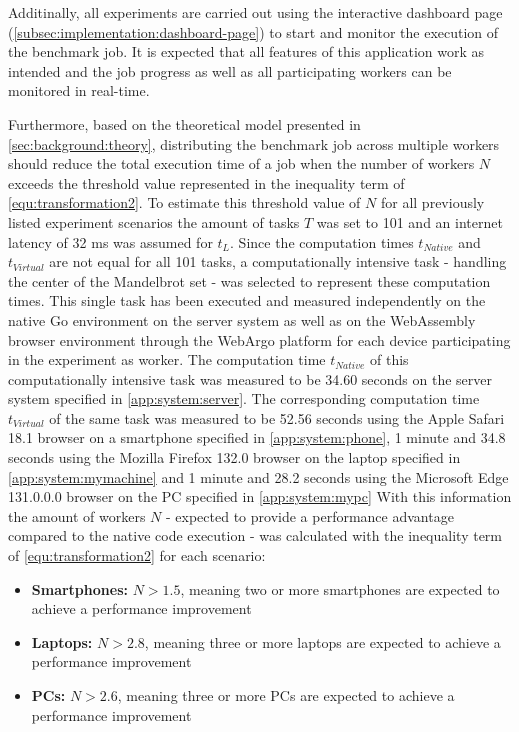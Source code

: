 Additinally, all experiments are carried out using the interactive dashboard page (\autoref{subsec:implementation:dashboard-page}) to start and monitor the execution of the benchmark job. It is expected that all features of this application work as intended and the job progress as well as all participating workers can be monitored in real-time.

Furthermore, based on the theoretical model presented in \autoref{sec:background:theory}, distributing the benchmark job across multiple workers should reduce the total execution time of a job when the number of workers $N$ exceeds the threshold value represented in the inequality term of \eqref{equ:transformation2}. To estimate this threshold value of $N$ for all previously listed experiment scenarios the amount of tasks $T$ was set to 101 and an internet latency of 32 ms \cite{backend:latency} was assumed for $t_{L}$. Since the computation times $t_{Native}$ and $t_{Virtual}$ are not equal for all 101 tasks, a computationally intensive task - handling the center of the Mandelbrot set - was selected to represent these computation times. This single task has been executed and measured independently on the native Go environment on the server system as well as on the WebAssembly browser environment through the WebArgo platform for each device participating in the experiment as worker. The computation time $t_{Native}$ of this computationally intensive task was measured to be 34.60 seconds on the server system specified in \autoref{app:system:server}. The corresponding computation time $t_{Virtual}$ of the same task was measured to be 52.56 seconds using the Apple Safari 18.1 \cite{evaluation:safari} browser on a smartphone specified in \autoref{app:system:phone}, 1 minute and 34.8 seconds using the Mozilla Firefox 132.0 \cite{background:firefox} browser on the laptop specified in \autoref{app:system:mymachine} and 1 minute and 28.2 seconds using the Microsoft Edge 131.0.0.0 \cite{evaluation:edge} browser on the \acs{PC} specified in \autoref{app:system:mypc} With this information the amount of workers $N$ - expected to provide a performance advantage compared to the native code execution - was calculated with the inequality term of \eqref{equ:transformation2} for each scenario:
\begin{itemize}
    \item \textbf{Smartphones:} $N > 1.5$, meaning two or more smartphones are expected to achieve a performance improvement 
    \item \textbf{Laptops:} $N > 2.8$, meaning three or more laptops are expected to achieve a performance improvement
    \item \textbf{PCs:} $N > 2.6$, meaning three or more \acs{PC}s are expected to achieve a performance improvement
\end{itemize}

